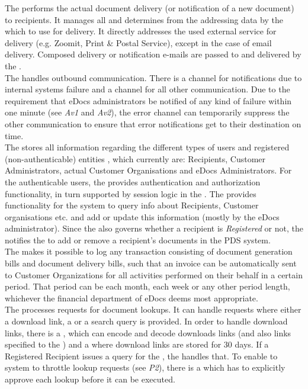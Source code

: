 The  performs the actual document delivery (or notification of a new document) to recipients. It manages all  and determines from the addressing data by the  which  to use for delivery. It directly addresses the used external service for delivery (e.g. Zoomit, Print \& Postal Service), except in the case of email delivery. Composed delivery or notification e-mails are passed to and delivered by the .\\
The  handles outbound communication. There is a channel for notifications due to internal systems failure and a channel for all other communication. Due to the requirement that eDocs administrators be notified of any kind of failure within one minute (see \emph{Av1} and \emph{Av2}), the error channel can temporarily suppress the other communication to ensure that error notifications get to their destination on time.\\
The  stores all information regarding the different types of users and registered (non-authenticable) entities , which currently are: Recipients, Customer Administrators, actual Customer Organisations and eDocs Administrators. For the authenticable users, the  provides authentication and authorization functionality, in turn supported by session logic in the . The  provides functionality for the system to query info about Recipients, Customer organisations etc. and add or update this information (mostly by the eDocs administrator). Since the  also governs whether a recipient is \emph{Registered} or not, the  notifies the  to add or remove a recipient's documents in the PDS system.\\
The  makes it possible to log any transaction consisting of document generation bills and document delivery bills, such that an invoice can be automatically sent to Customer Organizations for all activities performed on their behalf in a certain period. That period can be each month, each week or any other period length, whichever the financial department of eDocs deems most appropriate.\\
The  processes requests for document lookups. It can handle requests where either a download link, a  or a search query is provided. In order to handle download links, there is a , which can encode and decode downloads links (and also links specified to the ) and a  where download links are stored for 30 days. If a Registered Recipient issues a query for the , the  handles that. To enable to system to throttle lookup requests (see \emph{P2}), there is a  which has to explicitly approve each lookup before it can be executed.\\

